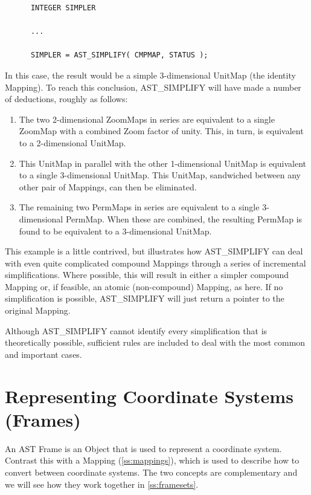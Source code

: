 \documentclass[twoside,11pt]{article}
\newcommand{\htmlref}[2]{#1}
\newcommand{\secref}[1]{\S\ref{#1}}
\renewcommand{\secref}[1]{\ref{#1}}
\begin{document}
\small
\begin{verbatim}
      INTEGER SIMPLER

      ...

      SIMPLER = AST_SIMPLIFY( CMPMAP, STATUS );
\end{verbatim}
\normalsize

In this case, the result would be a simple 3-dimensional UnitMap (the
identity Mapping).  To reach this conclusion, AST\_SIMPLIFY will have
made a number of deductions, roughly as follows:

\begin{enumerate}
\item The two 2-dimensional ZoomMaps in series are equivalent to a
single \htmlref{ZoomMap}{ZoomMap} with a combined \htmlref{Zoom}{Zoom} factor of unity. This, in turn, is
equivalent to a 2-dimensional UnitMap.

\item This UnitMap in parallel with the other 1-dimensional UnitMap is
equivalent to a single 3-dimensional UnitMap. This UnitMap, sandwiched
between any other pair of Mappings, can then be eliminated.

\item The remaining two PermMaps in series are equivalent to a single
3-dimensional \htmlref{PermMap}{PermMap}. When these are combined, the resulting PermMap
is found to be equivalent to a 3-dimensional UnitMap.
\end{enumerate}

This example is a little contrived, but illustrates how AST\_SIMPLIFY
can deal with even quite complicated compound Mappings through a
series of incremental simplifications. Where possible, this will
result in either a simpler compound Mapping or, if feasible, an atomic
(non-compound) Mapping, as here. If no simplification is possible,
AST\_SIMPLIFY will just return a pointer to the original Mapping.

Although AST\_SIMPLIFY cannot identify every simplification that is
theoretically possible, sufficient rules are included to deal with the
most common and important cases.

\cleardoublepage
\section{\label{ss:frames}Representing Coordinate Systems (Frames)}

An AST \htmlref{Frame}{Frame} is an \htmlref{Object}{Object} that is used to represent a coordinate
system. Contrast this with a \htmlref{Mapping}{Mapping} (\secref{ss:mappings}), which is
used to describe how to convert between coordinate systems. The two
concepts are complementary and we will see how they work together in
\secref{ss:framesets}.
\end{document}
